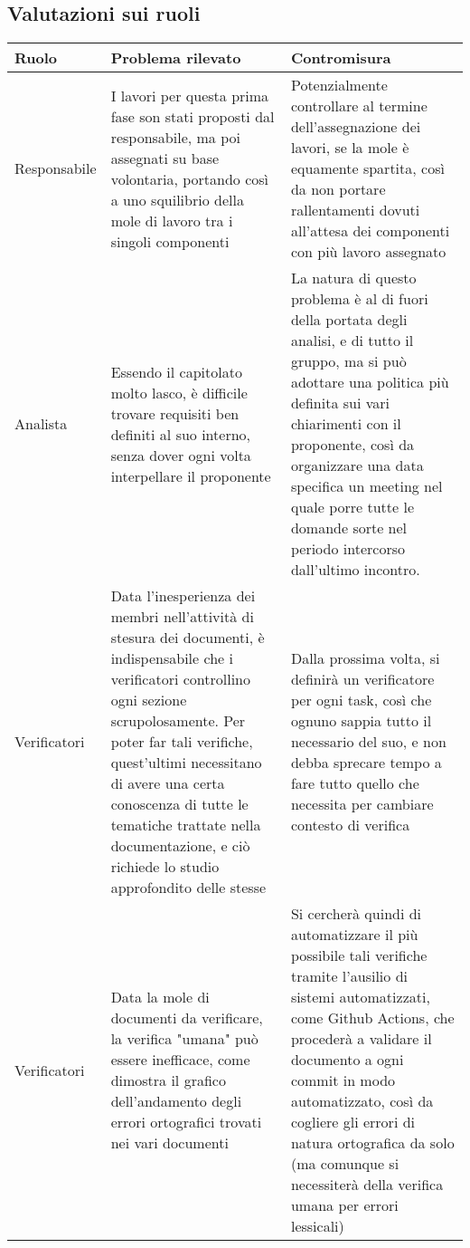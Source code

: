 	\subsection{Valutazioni sui ruoli}
		\begin{center}
			\begin{longtable}{|p{3cm}|p{6cm}|p{6cm}|}
			\hline
			\rowcolor{lighter-grayer}
			\textbf{Ruolo} & \textbf{Problema rilevato} & \textbf{Contromisura}\\
			\hline
			\endfirsthead
			\hline
			Responsabile
			 &
			I lavori per questa prima fase son stati proposti dal responsabile, ma poi assegnati su base volontaria, portando così a uno squilibrio della mole di lavoro tra i singoli componenti
			 &
			Potenzialmente controllare al termine dell'assegnazione dei lavori, se la mole è equamente spartita, così da non portare rallentamenti dovuti all'attesa dei componenti con più lavoro assegnato \\
			\hline
		
			Analista
			 &
			Essendo il capitolato molto lasco, è difficile trovare requisiti ben definiti al suo interno, senza dover ogni volta interpellare il proponente
	 		&
			La natura di questo problema è al di fuori della portata degli analisi, e di tutto il gruppo, ma si può adottare una politica più definita sui vari chiarimenti con il proponente, così da organizzare una data specifica un meeting nel quale porre tutte le domande sorte nel periodo intercorso dall'ultimo incontro. \\
			\hline

			Verificatori
	 		&
			Data l'inesperienza dei membri nell'attività di stesura dei documenti, è indispensabile che i verificatori controllino ogni sezione scrupolosamente. Per poter far tali verifiche, quest'ultimi necessitano di avere una certa conoscenza di tutte le tematiche trattate nella documentazione, e ciò richiede lo studio approfondito delle stesse
	 		&
			Dalla prossima volta, si definirà un verificatore per ogni task, così che ognuno sappia tutto il necessario del suo, e non debba sprecare tempo a fare tutto quello che necessita per cambiare contesto di verifica \\
			\hline
			Verificatori
	 		&
			Data la mole di documenti da verificare, la verifica "umana" può essere inefficace, come dimostra il grafico dell'andamento degli errori ortografici trovati nei vari documenti
	 		&
			Si cercherà quindi di automatizzare il più possibile tali verifiche tramite l'ausilio di sistemi automatizzati, come Github Actions, che procederà a validare il documento a ogni commit in modo automatizzato, così da cogliere gli errori di natura ortografica da solo (ma comunque si necessiterà della verifica umana per errori lessicali) \\
			\hline


\end{longtable}
\end{center}
